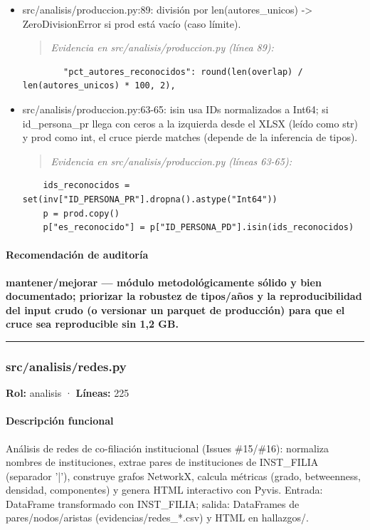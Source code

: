 \begin{tcolorbox}[riesgo]
\begin{itemize}
  \item src/analisis/produccion.py:89: división por len(autores\_unicos) -> ZeroDivisionError si prod está vacío (caso límite).
\begin{quote}\footnotesize\ttfamily
\noindent\emph{Evidencia en src/analisis/produccion.py (línea 89):}
\end{quote}
\begin{lstlisting}
        "pct_autores_reconocidos": round(len(overlap) / len(autores_unicos) * 100, 2),
\end{lstlisting}

  \item src/analisis/produccion.py:63-65: isin usa IDs normalizados a Int64; si id\_persona\_pr llega con ceros a la izquierda desde el XLSX (leído como str) y prod como int, el cruce pierde matches (depende de la inferencia de tipos).
\begin{quote}\footnotesize\ttfamily
\noindent\emph{Evidencia en src/analisis/produccion.py (líneas 63-65):}
\end{quote}
\begin{lstlisting}
    ids_reconocidos = set(inv["ID_PERSONA_PR"].dropna().astype("Int64"))
    p = prod.copy()
    p["es_reconocido"] = p["ID_PERSONA_PD"].isin(ids_reconocidos)
\end{lstlisting}

\end{itemize}
\end{tcolorbox}

\paragraph{Recomendación de auditoría}
\textbf{mantener/mejorar --- módulo metodológicamente sólido y bien documentado; priorizar la robustez de tipos/años y la reproducibilidad del input crudo (o versionar un parquet de producción) para que el cruce sea reproducible sin 1,2 GB.}

\medskip
\hrule

\subsubsection{src/analisis/redes.py}
\textbf{Rol:} analisis · \textbf{Líneas:} 225

\paragraph{Descripción funcional}
Análisis de redes de co-filiación institucional (Issues \#15/\#16): normaliza nombres de instituciones, extrae pares de instituciones de INST\_FILIA (separador '|'), construye grafos NetworkX, calcula métricas (grado, betweenness, densidad, componentes) y genera HTML interactivo con Pyvis. Entrada: DataFrame transformado con INST\_FILIA; salida: DataFrames de pares/nodos/aristas (evidencias/redes\_*.csv) y HTML en hallazgos/.

